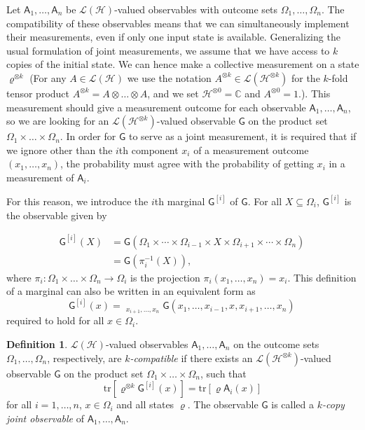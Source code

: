 \documentclass[12pt]{amsart}
\theoremstyle{definition}
\newtheorem{definition}{Definition}
\newcommand{\complex}{\mathbb C} %
\newcommand{\hi}{\mathcal{H}} %
\newcommand{\hh}{\mathcal{H}} %
\newcommand{\lh}{\mathcal{L(H)}} %
\newcommand{\elle}[1]{\mathcal{L}(#1)} %
\newcommand{\tr}[1]{\mathrm{tr}\left[#1\right]} %
\newcommand{\A}{\mathsf{A}}%
\newcommand{\G}{\mathsf{G}}%
\begin{document}
Let $\A_1,\ldots,\A_n$ be $\lh$-valued observables with outcome sets $\Omega_1,\ldots,\Omega_n$.
The compatibility of these observables means that we can simultaneously implement their measurements, even if only one input state is available.
Generalizing the usual formulation of joint measurements, we assume that we have access to $k$ copies of the initial state. 
We can hence make a collective measurement on a  state $\varrho^{\otimes k}$ (For any $A\in\lh$ we use the notation $A^{\otimes k}\in\mathcal{L}(\hi^{\otimes k})$ for the $k$-fold tensor product $A^{\otimes k} = A\otimes \ldots \otimes A$, and we set $\hh^{\otimes 0}=\complex$  and $A^{\otimes 0} = 1$.). This measurement should give a measurement outcome for each observable $\A_1,\ldots,\A_n$, so we are looking for an $\elle{\hi^{\otimes k}}$-valued observable $\G$ on the product set $\Omega_1\times\ldots\times\Omega_n$.
In order for $\G$ to serve as a joint measurement, it is required that if we ignore other than the $i$th component $x_i$ of a measurement outcome $(x_1,\ldots,x_n)$, the probability must agree with the probability of getting $x_i$ in a measurement of $\A_i$.

For this reason, we introduce the $i$th marginal $\G^{[i]}$ of $\G$.
For all $X\subseteq\Omega_i$, $\G^{[i]}$ is the observable given by

\begin{align*}%
\G^{[i]}(X) &= \G(\Omega_1 \times\cdots\times\Omega_{i-1}\times X \times\Omega_{i+1}\times\cdots\times\Omega_n) \, \\
& = \G(\pi_i^{-1}(X)) ,\nonumber
\end{align*}
where $\pi_i:\Omega_1\times\ldots\times\Omega_n\to\Omega_i$ is the projection $\pi_i(x_1,\ldots, x_n)= x_i$. 
This definition of a marginal can also be written in an equivalent form as 
\begin{equation*}
\G^{[i]}(x) = \mathop{\sum_{x_1,\ldots,x_{i-1},}}_{x_{i+1},\ldots,x_n} \G(x_1,\ldots,x_{i-1},x,x_{i+1},\ldots,x_n) \, 
\end{equation*}
required to hold for all $x\in\Omega_i$.




\begin{definition}\label{prop:marginal}
$\lh$-valued observables $\A_1,\ldots,\A_n$ on the outcome sets $\Omega_1,\ldots,\Omega_n$, respectively, are \emph{$k$-compatible} if there exists an $\elle{\hh^{\otimes k}}$-valued observable $\G$ on the product set $\Omega_1\times\ldots\times\Omega_n$, such that
\begin{equation}\label{eq:marginal}
\tr{\varrho^{\otimes k} \G^{[i]}(x)} = \tr{\varrho \A_i(x)}
\end{equation}
for all $i=1,\ldots,n$, $x \in \Omega_i$ and all states $\varrho$.
The observable $\G$ is called a \emph{$k$-copy joint observable} of $\A_1,\ldots,\A_n$.
\end{definition}
\end{document}
